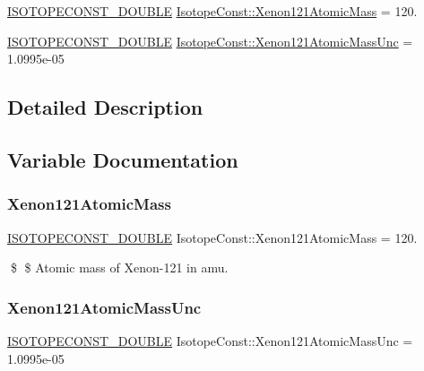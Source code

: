 \begin{DoxyCompactItemize}
\item 
\mbox{\hyperlink{group___isotope_const-_macros_ga8f45a7272ce02c0b4c65c44636ed719a}{I\+S\+O\+T\+O\+P\+E\+C\+O\+N\+S\+T\+\_\+\+D\+O\+U\+B\+LE}} \mbox{\hyperlink{group___isotope_const-_xenon-_xe121_ga68181a6fea9521a56b29fbe4abbb2a98}{Isotope\+Const\+::\+Xenon121\+Atomic\+Mass}} = 120.
\item 
\mbox{\hyperlink{group___isotope_const-_macros_ga8f45a7272ce02c0b4c65c44636ed719a}{I\+S\+O\+T\+O\+P\+E\+C\+O\+N\+S\+T\+\_\+\+D\+O\+U\+B\+LE}} \mbox{\hyperlink{group___isotope_const-_xenon-_xe121_gac3b67b64dfc702b009ae5fb92ffbf3f2}{Isotope\+Const\+::\+Xenon121\+Atomic\+Mass\+Unc}} = 1.\+0995e-\/05
\end{DoxyCompactItemize}


\subsection{Detailed Description}


\subsection{Variable Documentation}
\mbox{\label{group___isotope_const-_xenon-_xe121_ga68181a6fea9521a56b29fbe4abbb2a98}} 
\subsubsection{\texorpdfstring{Xenon121\+Atomic\+Mass}{Xenon121AtomicMass}}
{\footnotesize\ttfamily \mbox{\hyperlink{group___isotope_const-_macros_ga8f45a7272ce02c0b4c65c44636ed719a}{I\+S\+O\+T\+O\+P\+E\+C\+O\+N\+S\+T\+\_\+\+D\+O\+U\+B\+LE}} Isotope\+Const\+::\+Xenon121\+Atomic\+Mass = 120.}

\$ \$ Atomic mass of Xenon-\/121 in amu. \mbox{\label{group___isotope_const-_xenon-_xe121_gac3b67b64dfc702b009ae5fb92ffbf3f2}} 
\subsubsection{\texorpdfstring{Xenon121\+Atomic\+Mass\+Unc}{Xenon121AtomicMassUnc}}
{\footnotesize\ttfamily \mbox{\hyperlink{group___isotope_const-_macros_ga8f45a7272ce02c0b4c65c44636ed719a}{I\+S\+O\+T\+O\+P\+E\+C\+O\+N\+S\+T\+\_\+\+D\+O\+U\+B\+LE}} Isotope\+Const\+::\+Xenon121\+Atomic\+Mass\+Unc = 1.\+0995e-\/05}

